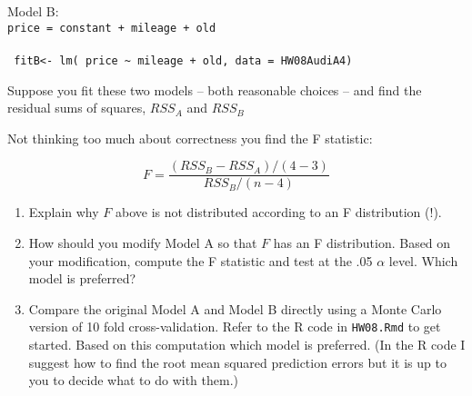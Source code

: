 \documentclass[10pt]{report}
\begin{document}
\begin{enumerate}
Model B: \\
{\tt price =  constant + mileage + old } \\ \\
\verb! fitB<- lm( price ~ mileage + old, data = HW08AudiA4) !

Suppose you fit these two models -- both reasonable choices -- and find the residual sums of squares, $RSS_A$ and $RSS_B$

Not thinking too much about correctness  you find the F statistic:

\[ F = \frac{(RSS_B - RSS_A)/(4- 3) } { RSS_B/ (n-4)} \]

\begin{enumerate}

\item Explain why $F$ above is not distributed according to an F distribution (!).
\item How should you modify Model A so that $F$ has an F distribution. Based on your modification,
compute the F statistic and test at  the .05 $\alpha$ level.  Which model is preferred? 

\item Compare the original Model A and Model B directly using  a Monte Carlo version of 10 fold cross-validation. 
Refer to the R code in {\tt HW08.Rmd} to get started. Based on this computation which model is preferred. (In the R code I suggest how to find the root mean squared prediction errors but it is up to you to decide what to do with them.)
\end{enumerate}



 \end{enumerate}
 
\end{document}
